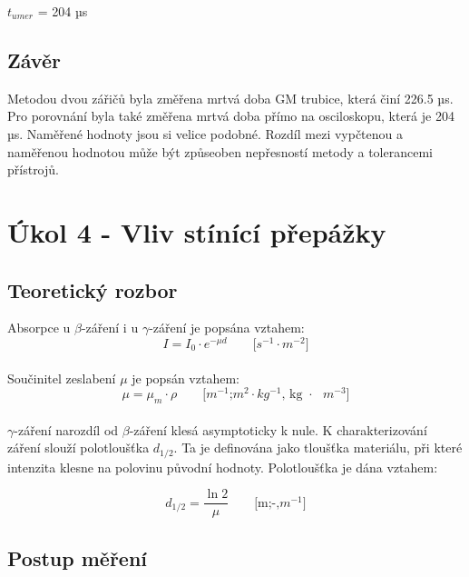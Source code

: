 \documentclass{protokol}
\begin{document}

    $t_{umer}$ = 204 µs
    


    \subsection{Závěr}

    Metodou dvou zářičů byla změřena mrtvá doba GM trubice, která činí 226.5 µs. Pro porovnání byla také změřena mrtvá doba přímo na osciloskopu, která je 204 µs. Naměřené hodnoty jsou si velice podobné. Rozdíl mezi vypčtenou a naměřenou hodnotou může být způseoben nepřesností metody a tolerancemi přístrojů.

\pagebreak

\section{Úkol 4 - Vliv stínící přepážky}
    \subsection{Teoretický rozbor}

    Absorpce u $\beta$-záření i u $\gamma$-záření je popsána vztahem:
    \begin{equation}   
        I = I_0 \cdot e^{-\mu d}      \quad \quad    \text{[$s^{-1}$$\cdot$$m^{-2}$]}
    \end{equation}
    \\
    Součinitel zeslabení $\mu$ je popsán vztahem:
    \begin{equation}   
        \mu =  \mu_m \cdot \rho      \quad \quad    \text{[$m^{-1}$;$m^2$$\cdot$$kg^{-1}$, kg $\cdot$ $m^{-3}$]}
    \end{equation}
    \\
    $\gamma$-záření narozdíl od $\beta$-záření klesá asymptoticky k nule. K charakterizování záření slouží polotloušťka $d_{1/2}$. Ta je definována jako tloušťka materiálu, při které intenzita klesne na polovinu původní hodnoty. Polotloušťka je dána vztahem:

    \begin{equation}   
        d_{1/2} =  \dfrac{\ln{2}}{\mu}      \quad \quad    \text{[m;-,$m^{-1}$]}
    \end{equation}

    \subsection{Postup měření}
\end{document}
